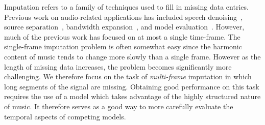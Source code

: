 \documentclass{article}
\newcommand{\FIXME}[2][FIXME]{\textcolor{blue}{\textbf{#1}: \emph{#2}}}
\begin{document}
Imputation refers to a family of techniques used to fill in missing
data entries.  Previous work on audio-related applications has
included speech denoising~\cite{Raj1998}, source
separation~\cite{Reyes-Gomez2005}, bandwidth
expansion~\cite{Smaragdis2009}, and model
evaluation~\cite{Hoffman2010}.  However, much of the
previous work has focused on at most a single time-frame.
The single-frame imputation problem is often somewhat easy since the
harmonic content of music tends to change more slowly than a single
frame.  However as the length of missing data increases, the problem
becomes significantly more challenging.
%
We therefore focus on the task of \emph{multi-frame} imputation in
which long segments of the signal are missing.
%
Obtaining good performance on this task requires the use of a model
which takes advantage of the highly structured nature of music.  It
therefore serves as a good way to
more carefully evaluate the temporal aspects of competing
models.  %

\end{document}
